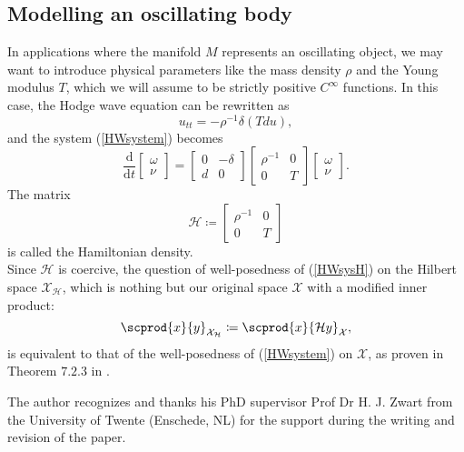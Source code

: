 \documentclass{ifacconf}
\begin{document}
\subsection{Modelling an oscillating body}
    In applications where the manifold $M$ represents an oscillating object, we may want to introduce physical parameters like the mass density $\rho$ and the Young modulus $T$, which we will assume to be strictly positive $C^{\infty}$ functions. In this case, the Hodge wave equation can be rewritten as
    \begin{equation}\label{HWc}
        u_{tt}=-\rho^{-1}\delta(T du),
    \end{equation}
    and the system (\ref{HWsystem}) becomes
    \begin{equation}\label{HWsysH}
    \frac{\mathrm{d}}{\mathrm{d}t}\begin{bmatrix}
         \omega  \\
         \nu
    \end{bmatrix}=\begin{bmatrix}
        0 & -\delta \\
        d & 0  
    \end{bmatrix}\begin{bmatrix}
        \rho^{-1} & 0\\
        0 & T
    \end{bmatrix}
        \begin{bmatrix}
         \omega  \\
         \nu
    \end{bmatrix}.
\end{equation}
    The matrix 
    \[
        \mathcal{H}\coloneqq
            \begin{bmatrix}
            \rho^{-1} & 0\\
            0 & T
            \end{bmatrix}
    \]
    is called the Hamiltonian density.\\
    Since $\mathcal{H}$ is coercive, the question of well-posedness of (\ref{HWsysH}) on the Hilbert space $\mathcal{X}_{\mathcal{H}}$, which is nothing but our original space $\mathcal{X}$ with a modified inner product:
    \[
        \scprod{x}{y}_{\mathcal{X}_\mathcal{H}}\coloneqq \scprod{x}{\mathcal{H}y}_{\mathcal{X}},
    \]
    is equivalent to that of the well-posedness of (\ref{HWsystem}) on $\mathcal{X}$, as proven in Theorem $7.2.3$ in \cite{JZ:12}.
\begin{ack}
    The author recognizes and thanks his PhD supervisor Prof Dr H. J. Zwart from the University of Twente (Enschede, NL) for the support during the writing and revision of the paper.
\end{ack}
\end{document}
